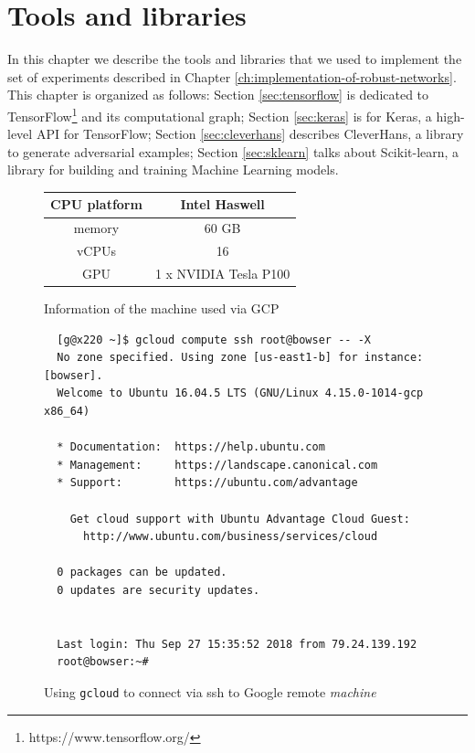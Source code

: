 \chapter{Tools and libraries}
\label{ch:tools-and-libraries}

In this chapter we describe the tools and libraries that we used to
implement the set of experiments described in Chapter
\ref{ch:implementation-of-robust-networks}. This chapter is organized as follows: Section
\ref{sec:tensorflow} is dedicated to
TensorFlow\footnote{https://www.tensorflow.org/} and its computational
graph; Section \ref{sec:keras} is for Keras, a high-level API for
TensorFlow; Section \ref{sec:cleverhans} describes CleverHans, a
library to generate adversarial examples; Section \ref{sec:sklearn}
talks about Scikit-learn, a library for building and training Machine
Learning models.

\begin{figure}
  \centering
  \begin{tabular}{|c|c|}
    \hline
    CPU platform & Intel Haswell \\
    \hline
    memory & 60 GB \\
    \hline
    vCPUs & 16 \\
    \hline
    GPU & 1 x NVIDIA Tesla P100 \\
    \hline
  \end{tabular}
  \caption{Information of the machine used via GCP}
  \label{fig:expensive-machine}
\end{figure}

\begin{figure}
  \begin{verbatim}
  [g@x220 ~]$ gcloud compute ssh root@bowser -- -X
  No zone specified. Using zone [us-east1-b] for instance: [bowser].
  Welcome to Ubuntu 16.04.5 LTS (GNU/Linux 4.15.0-1014-gcp x86_64)

  * Documentation:  https://help.ubuntu.com
  * Management:     https://landscape.canonical.com
  * Support:        https://ubuntu.com/advantage

    Get cloud support with Ubuntu Advantage Cloud Guest:
      http://www.ubuntu.com/business/services/cloud

  0 packages can be updated.
  0 updates are security updates.


  Last login: Thu Sep 27 15:35:52 2018 from 79.24.139.192
  root@bowser:~# 
  \end{verbatim}
  \caption{Using \texttt{gcloud} to connect via ssh to Google remote
    \emph{machine}}
  \label{fig:ssh-to-gcp}
\end{figure}

